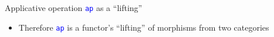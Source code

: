 \documentclass[english]{beamer}
\begin{document}
\begin{frame}{Applicative operation \texttt{\textcolor{blue}{\footnotesize{}ap}}
as a ``lifting''}
\begin{itemize}
{\begin{align*}
\end{align*}
}{\footnotesize \par}
\begin{itemize}
\item The first 3 laws are the identity \& associativity laws of a \emph{category}
\begin{itemize}
\item The morphism type is $A\rightsquigarrow B\equiv F^{A\Rightarrow B}$,
the composition is $\odot$
\end{itemize}
\item The last 2 laws are naturality laws, connecting $\text{fmap}$ and
$\odot$
\end{itemize}
\item Therefore \texttt{\textcolor{blue}{\footnotesize{}ap}} is a functor's
``lifting'' of morphisms from two categories
\end{itemize}
\end{frame}
\end{document}
